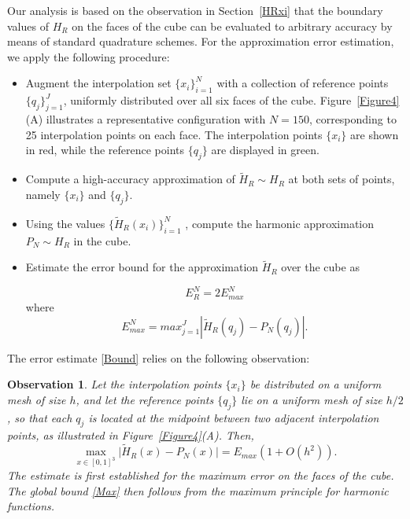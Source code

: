 \documentclass[12pt,oneside,reqno]{amsart}%
\theoremstyle{plain}
\newtheorem{observation}[theorem]{Observation}
\numberwithin{equation}{section}
\begin{document}
Our analysis is based on the observation in Section~\ref{HRxi} that
the boundary values of $H_R$ on the faces of the cube can be
evaluated to arbitrary accuracy by means of standard quadrature
schemes. For the approximation error estimation, we apply the following procedure:
\begin{itemize}
\item Augment the interpolation
set $\{x_i\}_{i=1}^{N}$ with a collection of reference points
$\{q_j\}_{j=1}^{J}$, uniformly distributed over all six faces of the
cube. Figure~\ref{Figure4}(A) illustrates a representative
configuration with $N=150$, corresponding to 25 interpolation
points on each face. The interpolation points $\{x_i\}$ are shown in
red, while the reference points $\{q_j\}$ are displayed in green.
\item
Compute a high-accuracy approximation of $\tilde H_R\sim H_R$ at both
sets of points, namely $\{x_i\}$ and $\{q_j\}$.
\item
Using the values $\{\tilde H_R(x_i)\}_{i=1}^N$
, compute the harmonic approximation  $P_N\sim H_R$ in the cube.
\item Estimate the error bound for the approximation $\tilde H_R$ over the cube as 

\begin{equation}\label{Bound}
E^N_R= 2E^N_{max}
\end{equation}
where
\begin{equation}\label{Emax}
E^N_{max}= max_{j=1}^J|\tilde H_R(q_j)-P_N(q_j)|.
\end{equation}

\end{itemize}

The error estimate \eqref{Bound} relies on the following observation:

\begin{observation}
Let the interpolation points $\{x_i\}$ be distributed on a uniform
mesh of size $h$, and let the reference points $\{q_j\}$ lie on a
uniform mesh of size $h/2$, so that each $q_j$ is located at the
midpoint between two adjacent interpolation points, as illustrated
in Figure~\ref{Figure4}(A).
Then,
\begin{equation}\label{Max}
\max_{x\in [0,1]^3} \bigl|\tilde H_R(x)-P_N(x)\bigr|
= E_{max}(1 + O(h^2)).
\end{equation}
The estimate is first established for the maximum error on the faces
of the cube. The global bound \eqref{Max} then follows from the
maximum principle for harmonic functions.

\end{observation}
\end{document}

